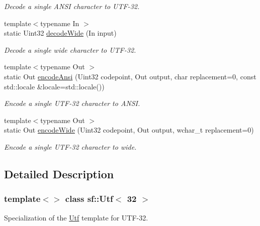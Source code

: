 \begin{DoxyCompactItemize}
\begin{DoxyCompactList}\small\item\em Decode a single A\+N\+SI character to U\+T\+F-\/32. \end{DoxyCompactList}\item 
{\footnotesize template$<$typename In $>$ }\\static Uint32 \mbox{\hyperlink{classsf_1_1_utf_3_0132_01_4_a043fe25f5f4dbc205e78e6f1d99840dc}{decode\+Wide}} (In input)
\begin{DoxyCompactList}\small\item\em Decode a single wide character to U\+T\+F-\/32. \end{DoxyCompactList}\item 
{\footnotesize template$<$typename Out $>$ }\\static Out \mbox{\hyperlink{classsf_1_1_utf_3_0132_01_4_af6590226a071076ca22d818573a16ded}{encode\+Ansi}} (Uint32 codepoint, Out output, char replacement=0, const std\+::locale \&locale=std\+::locale())
\begin{DoxyCompactList}\small\item\em Encode a single U\+T\+F-\/32 character to A\+N\+SI. \end{DoxyCompactList}\item 
{\footnotesize template$<$typename Out $>$ }\\static Out \mbox{\hyperlink{classsf_1_1_utf_3_0132_01_4_a52e511e74ddc5df1bbf18f910193bc47}{encode\+Wide}} (Uint32 codepoint, Out output, wchar\+\_\+t replacement=0)
\begin{DoxyCompactList}\small\item\em Encode a single U\+T\+F-\/32 character to wide. \end{DoxyCompactList}\end{DoxyCompactItemize}


\subsection{Detailed Description}
\subsubsection*{template$<$$>$\newline
class sf\+::\+Utf$<$ 32 $>$}

Specialization of the \mbox{\hyperlink{classsf_1_1_utf}{Utf}} template for U\+T\+F-\/32. 

\begin{DoxyVerb}\end{DoxyVerb}
 

